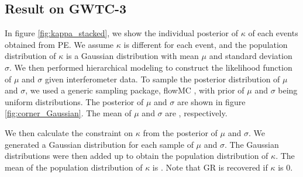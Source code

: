 \documentclass[aps,prd,twocolumn,superscriptaddress,preprintnumbers,floatfix,nofootinbib]{revtex4-2}
\begin{document}
\subsection{Result on GWTC-3}

In figure \ref{fig:kappa_stacked}, we show the individual posterior of $\kappa$ of each events obtained from PE.
We assume $\kappa$ is different for each event, and the population distribution of $\kappa$ is a Gaussian distribution with mean $\mu$ and standard deviation $\sigma$.
We then performed hierarchical modeling to construct the likelihood function of $\mu$ and $\sigma$ given interferometer data.
To sample the posterior distribution of $\mu$ and $\sigma$, we used a generic sampling package, flowMC \citep{flowMC}, with prior of $\mu$ and $\sigma$ being uniform distributions.
The posterior of $\mu$ and $\sigma$ are shown in figure \ref{fig:corner_Gaussian}.
The mean of $\mu$ and $\sigma$ are , respectively.


We then calculate the constraint on $\kappa$ from the posterior of $\mu$ and $\sigma$.
We generated a Gaussian distribution for each sample of $\mu$ and $\sigma$.
The Gaussian distributions were then added up to obtain the population distribution of $\kappa$.
The mean of the population distribution of $\kappa$ is .
Note that GR is recovered if $\kappa$ is $0$.
\end{document}
